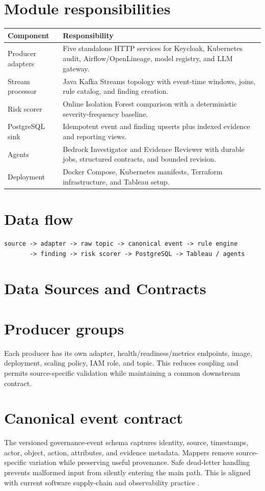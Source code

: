 \documentclass[12pt,oneside]{report}
\begin{document}
\section{Module responsibilities}
\begin{longtable}{p{}p{}}\toprule Component & Responsibility\\\midrule
Producer adapters & Five standalone HTTP services for Keycloak, Kubernetes audit, Airflow/OpenLineage, model registry, and LLM gateway.\\
Stream processor & Java Kafka Streams topology with event-time windows, joins, rule catalog, and finding creation.\\
Risk scorer & Online Isolation Forest comparison with a deterministic severity-frequency baseline.\\
PostgreSQL sink & Idempotent event and finding upserts plus indexed evidence and reporting views.\\
Agents & Bedrock Investigator and Evidence Reviewer with durable jobs, structured contracts, and bounded revision.\\
Deployment & Docker Compose, Kubernetes manifests, Terraform infrastructure, and Tableau setup.\\\bottomrule\end{longtable}
\section{Data flow}
\begin{lstlisting}
source -> adapter -> raw topic -> canonical event -> rule engine
       -> finding -> risk scorer -> PostgreSQL -> Tableau / agents
\end{lstlisting}

\section{Data Sources and Contracts}
\section{Producer groups}
Each producer has its own adapter, health/readiness/metrics endpoints, image, deployment, scaling policy, IAM role, and topic. This reduces coupling and permits source-specific validation while maintaining a common downstream contract.
\section{Canonical event contract}
The versioned governance-event schema captures identity, source, timestamps, actor, object, action, attributes, and evidence metadata. Mappers remove source-specific variation while preserving useful provenance. Safe dead-letter handling prevents malformed input from silently entering the main path. This is aligned with current software supply-chain and observability practice \cite{openssf2024,opentelemetry2024}.
\end{document}

